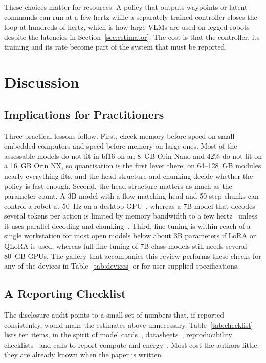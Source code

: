 \documentclass[applsci,review,submit,pdftex,oneauthor]{Definitions/mdpi}
\begin{document}
These choices matter for resources. A policy that outputs waypoints or latent commands can run at a few hertz while a separately trained controller closes the loop at hundreds of hertz, which is how large VLMs are used on legged robots despite the latencies in Section~\ref{sec:estimator}. The cost is that the controller, its training and its rate become part of the system that must be reported.

\section{Discussion}\label{sec:discussion}

\subsection{Implications for Practitioners}

Three practical lessons follow. First, check memory before speed on small embedded computers and speed before memory on large ones. Most of the assessable models do not fit in bf16 on an 8~GB Orin Nano and 42\% do not fit on a 16~GB Orin NX, so quantisation is the first lever there; on 64--128~GB modules nearly everything fits, and the head structure and chunking decide whether the policy is fast enough. Second, the head structure matters as much as the parameter count. A 3B model with a flow-matching head and 50-step chunks can control a robot at 50~Hz on a desktop GPU~\cite{ax241024164}, whereas a 7B model that decodes several tokens per action is limited by memory bandwidth to a few hertz~\cite{ax240609246} unless it uses parallel decoding and chunking~\cite{ax250219645}. Third, fine-tuning is within reach of a single workstation for most open models below about 3B parameters if LoRA or QLoRA is used, whereas full fine-tuning of 7B-class models still needs several 80~GB GPUs. The gallery that accompanies this review performs these checks for any of the \nDevices{} devices in Table~\ref{tab:devices} or for user-supplied specifications.

\subsection{A Reporting Checklist}

The disclosure audit points to a small set of numbers that, if reported consistently, would make the estimates above unnecessary. Table~\ref{tab:checklist} lists ten items, in the spirit of model cards~\cite{mitchell2019modelcards}, datasheets~\cite{gebru2021datasheets}, reproducibility checklists~\cite{pineau2021reproducibility} and calls to report compute and energy~\cite{strubell2019,schwartz2020green,henderson2020energy}. Most cost the authors little: they are already known when the paper is written.
\end{document}
